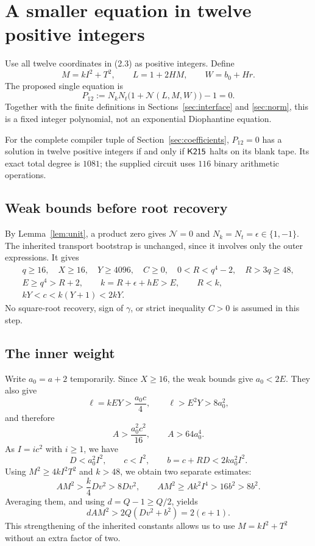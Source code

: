 \section{A smaller equation in twelve positive integers}
\label{sec:positive}

Use all twelve coordinates in (2.3) as positive integers. Define
\[
M=kI^2+T^2,\qquad L=1+2HM,\qquad W=b_0+Hr.
\tag{5.1}
\]
The proposed single equation is
\[
\boxed{\quad P_{12}:=N_kN_t\bigl(1+\mathcal N(L,M,W)\bigr)-1=0.\quad}
\tag{5.2}
\]
Together with the finite definitions in Sections~\ref{sec:interface}
and \ref{sec:norm}, this is a fixed integer polynomial, not an
exponential Diophantine equation.

\begin{theorem}\label{thm:positive}
For the complete compiler tuple of Section~\ref{sec:coefficients},
\(P_{12}=0\) has a solution in twelve positive integers if and only if
\(\mathsf{K215}\) halts on its blank tape. Its exact total degree is \(1081\);
the supplied circuit uses \(116\) binary arithmetic operations.
\end{theorem}

\subsection{Weak bounds before root recovery}

By Lemma~\ref{lem:unit}, a product zero gives
\(\mathcal N=0\) and \(N_k=N_t=\epsilon\in\{1,-1\}\).
The inherited transport bootstrap is unchanged, since it involves only
the outer expressions. It gives
\[
\begin{gathered}
q\ge16,\quad X\ge16,\quad Y\ge4096,\quad C\ge0,\quad
0<R<q^4-2,\quad R>3q\ge48,\\
E\ge q^4>R+2,\qquad
k=R+\epsilon+hE>E,\qquad R<k,\\
kY<c<k(Y+1)<2kY.
\end{gathered}
\tag{5.3}
\]
No square-root recovery, sign of \(\gamma\), or strict inequality
\(C>0\) is assumed in this step.

\subsection{The inner weight}

Write \(a_0=a+2\) temporarily. Since \(X\ge16\), the weak bounds give
\(a_0<2E\). They also give
\[
\ell=kEY>\frac{a_0c}{4},\qquad
\ell>E^2Y>8a_0^2,
\]
and therefore
\[
A>\frac{a_0^2c^2}{16},\qquad A>64a_0^4.
\tag{5.4}
\]
As \(I=ic^2\) with \(i\ge1\), we have
\[
D<a_0^2I^2,\qquad c<I^2,\qquad b=c+RD<2ka_0^2I^2.
\]
Using \(M^2\ge4kI^2T^2\) and \(k>48\), we obtain two separate estimates:
\[
AM^2>\frac{k}{4}Dv^2>8Dv^2,\qquad
AM^2\ge Ak^2I^4>16b^2>8b^2.
\]
Averaging them, and using \(d=Q-1\ge Q/2\), yields
\[
\boxed{\quad dAM^2>2Q(Dv^2+b^2)=2(e+1).\quad}
\tag{5.5}
\]
This strengthening of the inherited constants allows us to use
\(M=kI^2+T^2\) without an extra factor of two.

